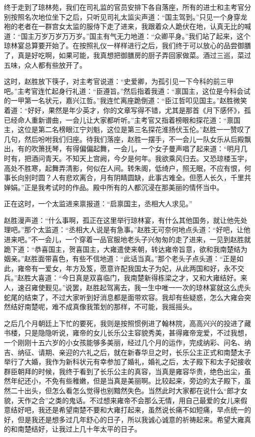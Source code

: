 终于走到了琼林苑，我们在司礼监的官员安排下各自落座，所有的进士和主考官分别按照名次地位坐下之后，只听见司礼太监尖声道：“国主驾到。”只见一个身穿龙袍的老者在一群宫女太监的服侍下走了进来，我跟着众人跪伏在地，认真无比的喊道：“国主万岁万岁万万岁。”国主有气无力地道：“众卿平身。”我们站了起来，这个琼林宴总算要开始了。在按照礼仪一样样进行之后，我们终于可以放心的品尝御膳了，真是好吃啊，如果可能，我真想把御膳房的厨子弄回家做菜。酒过三巡，菜过五味，众人都有些放开了。

这时，赵胜放下筷子，对主考官说道：“史爱卿，为孤引见一下今科的前三甲吧。”主考官连忙起身行礼道：“臣遵旨。”然后指着我道：“禀国主，这位是今科会试的一甲第一名状元，嘉兴江哲。”我连忙离座跪倒道：“臣江哲叩见国主。”赵胜微笑着道：“好好，果然是年少英才，你的文章写得不错，尤其是那首《月下感怀》，孤已经命人重新谱曲，一会儿让大家都听听。”主考官又指着榜眼和探花道：“禀国主，这位是第二名榜眼江宁刘魁，这位是第三名探花淮扬伏玉伦。”赵胜一一赞叹了几句，然后吩咐我们归座。待我们落座，赵胜一摆手，不一会儿一队女乐从后殿飘出，有的吹箫抚琴，有得偏偏起舞，一会儿，一个女子曼声唱了起来道：“明月几时有，把酒问青天。不知天上宫阙，今夕是何年。我欲乘风归去。又恐琼楼玉宇，高处不胜寒，起舞弄清影，何似在人间。转朱阁，低绮户，照无眠，不应有恨，何事长向别时圆？人有悲欢离合，月有阴睛圆缺，此事古难全。但愿人长久，千里共婵娟。”正是我考试时的作品。殿中所有的人都沉浸在那美丽的情怀当中。

正在这时，一个太监进来禀报道：“启禀国主，丞相大人求见。”

赵胜漫声道：“什么事啊，孤正在这里举行琼林宴，有什么其他国务，就让他先处理吧。”那个太监道：“丞相大人说是有急事。”赵胜无可奈何地点头道：“好吧，让他进来吧。”不一会儿，一个穿着一品官服地老头子兴匆匆的走了进来，一见到赵胜就跪下道：“恭喜国主，贺喜国主，大雍遣使来朝，转达雍帝旨意，欲和我南楚结为姻亲。”赵胜面带喜色，有些不信地道：“此话当真。”那个老头子点头道：“正是如此，雍帝有一爱女，年方及笈，愿意许配我国太子为妃，从此两国和好，永不交兵。”赵胜大喜道：“今日真是双喜临门，我南楚新得栋梁之才，又和大雍结好。来人，速召雍使觐见。”说罢，赵胜起驾离去，我一生中唯一一次的琼林宴就这么虎头蛇尾的结束了，不过大家听到好消息都是面带欢容。我却有些疑惑，怎么大雍会突然结好南楚呢，难不成真像我策划的那样，不可能，我摇摇头。

之后几个月朝廷上下忙的要死，我则是按照惯例进了翰林院，高高兴兴的投进了藏书楼，只是隐隐听说，雍帝的女儿长乐公主容貌秀美，甚得雍帝宠爱，不过我想，一个刚刚十五六岁的小女孩能够多美丽，经过几个月的运作，完成纳彩、问名、纳吉、纳征、请期、亲迎的六礼之后，就在新春华旦之时，长乐公主正式和南楚太子举行了大婚，我作为新科状元有幸参加了婚礼，婚礼之后，太子殿下和太子妃接收群臣朝拜的时候，我终于看到了长乐公主的真容，当真是雍容华贵，绝色出尘，虽然年纪还小，不免有些稚嫩，但是当真是美丽啊。比较起来，旁边的太子殿下，虽然二十出头，但怎么看怎么觉得也别黯然失色。当然此时大家都在说什么“郎才女貌，天作之合”之类的鬼话。不过想来雍帝不会那么无情，用自己最爱的女儿来假意结好吧，我还是希望南楚不要和大雍打起来，虽然说长痛不如短痛，早点统一的好，但是我还是想多过几年舒心的日子，所以我诚心诚意的祈祷起来。希望大雍真的和南楚结好，让我过上几十年太平的日子。

